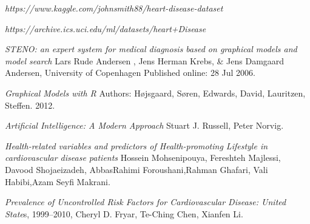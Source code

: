 \documentclass{article}
\begin{document}
\newpage
\begin{thebibliography}{9}

\textit{https://www.kaggle.com/johnsmith88/heart-disease-dataset}

\textit{https://archive.ics.uci.edu/ml/datasets/heart+Disease}

\textit{STENO: an expert system for medical diagnosis based on graphical models and model search} Lars Rude Andersen , Jens Herman Krebs, & Jens Damgaard Andersen, University of Copenhagen Published online: 28 Jul 2006.

\textit{Graphical Models with R}
Authors: Højsgaard, Søren, Edwards, David, Lauritzen, Steffen. 2012.


\textit{ Artificial Intelligence: A Modern Approach}  Stuart J. Russell, Peter Norvig.


\textit{Health-related variables and predictors of Health-promoting Lifestyle in cardiovascular disease patients} Hossein Mohsenipouya, Fereshteh Majlessi, Davood Shojaeizadeh, AbbasRahimi Foroushani,Rahman Ghafari, Vali Habibi,Azam Seyfi Makrani.

\textit{Prevalence of Uncontrolled Risk Factors for  Cardiovascular Disease: United State}s, 1999–2010, Cheryl D. Fryar, Te-Ching Chen, Xianfen Li.

\end{thebibliography} 
\end{document}
